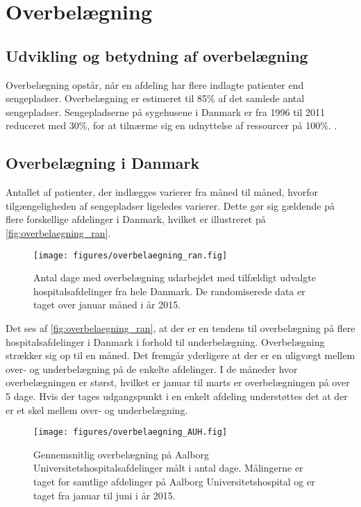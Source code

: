 \section{Overbelægning}

\subsection{Udvikling og betydning af overbelægning}
Overbelægning opstår, når en afdeling har flere indlagte patienter end sengepladser. \citep{denstoredanskeordbog1}  Overbelægning er estimeret til 85\% af det samlede antal sengepladser. Sengepladserne på sygehusene i Danmark er fra 1996 til 2011 reduceret med 30\%, for at tilnærme sig en udnyttelse af ressourcer på 100\%. 
\citep{Madsen2014}. 


\subsection{Overbelægning i Danmark}
Antallet af patienter, der indlægges varierer fra måned til måned, hvorfor tilgængeligheden af sengepladser ligeledes varierer. Dette gør sig gældende på flere forskellige afdelinger i Danmark, hvilket er illustreret på \autoref{fig:overbelaegning_ran}.
                   
\begin{figure}[H]
\centering
\texttt{[image: figures/overbelaegning\_ran.fig]}
\caption{Antal dage med overbelægning udarbejdet med tilfældigt udvalgte hospitalsafdelinger fra hele Danmark. De randomiserede data er taget over januar måned i år 2015. \citep{SDS2015} } 
\label{fig:overbelaegning_ran}
\end{figure}

\noindent
Det ses af \autoref{fig:overbelaegning_ran}, at der er en tendens til overbelægning på flere hospitalsafdelinger i Danmark i forhold til underbelægning. Overbelægning strækker sig op til en måned. Det fremgår yderligere at der er en uligvægt mellem over- og underbelægning på de enkelte afdelinger. I de måneder hvor overbelægningen er størst, hvilket er januar til marts er overbelægningen på over 5 dage. Hvis der tages udgangspunkt i en enkelt afdeling understøttes det at der er et skel mellem over- og underbelægning.\citep{SDS2015} 

\begin{figure}[H]
\centering
\texttt{[image: figures/overbelaegning\_AUH.fig]}
\caption{Gennemsnitlig overbelægning på Aalborg Universitetshospitalsafdelinger målt i antal dage. Målingerne er taget for samtlige afdelinger på Aalborg Universitetshospital og er taget fra januar til juni i år 2015.\citep{SDS2015} }
\label{fig:overbelaegning_AUH}
\end{figure}

